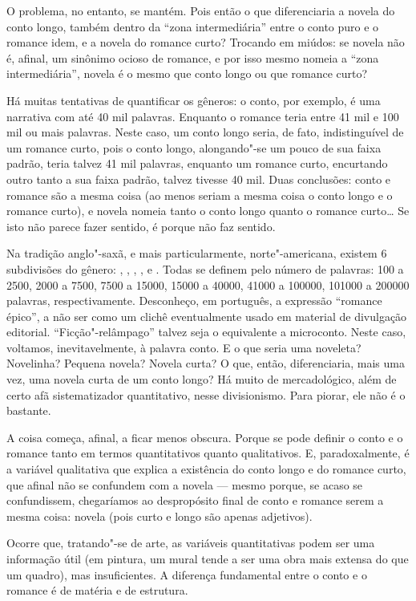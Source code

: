 \begin{changemargin}
O problema, no entanto, se mantém. Pois então o que diferenciaria a novela do conto longo, também dentro da ``zona intermediária'' entre o conto puro e o romance idem, e a novela do romance curto? Trocando em miúdos: se novela não é, afinal, um sinônimo ocioso de romance, e por isso mesmo nomeia a ``zona intermediária'', novela é o mesmo que conto longo ou que romance curto?

Há muitas tentativas de quantificar os gêneros: o conto, por exemplo, é uma narrativa com até 40 mil palavras. Enquanto o romance teria entre 41 mil e 100 mil ou mais palavras. Neste caso, um conto longo seria, de fato, indistinguível de um romance curto, pois o conto longo, alongando"-se um pouco de sua faixa padrão, teria talvez 41 mil palavras, enquanto um romance curto, encurtando outro tanto a sua faixa padrão, talvez tivesse 40 mil. Duas conclusões: conto e romance são a mesma coisa (ao menos seriam a mesma coisa o conto longo e o romance curto), e novela nomeia tanto o conto longo quanto o romance curto\ldots{} Se isto não parece fazer sentido, é porque não faz sentido.

Na tradição anglo"-saxã, e mais particularmente, norte"-americana, existem 6 subdivisões do gênero: {}, {}, {}, {}, {} e {}. Todas se definem pelo número de palavras: 100 a 2500, 2000 a 7500, 7500 a 15000, 15000 a 40000, 41000 a 100000, 101000 a 200000 palavras, respectivamente. Desconheço, em português, a expressão ``romance épico'', a não ser como um clichê eventualmente usado em material de divulgação editorial. ``Ficção"-relâmpago'' talvez seja o equivalente a microconto. Neste caso, voltamos, inevitavelmente, à palavra conto. E o que seria uma noveleta? Novelinha? Pequena novela? Novela curta? O que, então, diferenciaria, mais uma vez, uma novela curta de um conto longo? Há muito de mercadológico, além de certo afã sistematizador quantitativo, nesse divisionismo. Para piorar, ele não é o bastante.

A coisa começa, afinal, a ficar menos obscura. Porque se pode definir o conto e o romance tanto em termos quantitativos quanto qualitativos. E, paradoxalmente, é a variável qualitativa que explica a existência do conto longo e do romance curto, que afinal não se confundem com a novela --- mesmo porque, se acaso se confundissem, chegaríamos ao despropósito final de conto e romance serem a mesma coisa: novela (pois curto e longo são apenas adjetivos).

Ocorre que, tratando"-se de arte, as variáveis quantitativas podem ser uma informação útil (em pintura, um mural tende a ser uma obra mais extensa do que um quadro), mas insuficientes. A diferença fundamental entre o conto e o romance é de matéria e de estrutura.


\end{changemargin}
